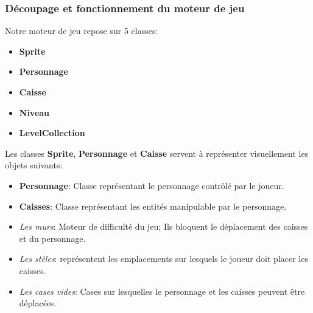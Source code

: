 \documentclass{article}
\begin{document}
		\subsubsection{Découpage et fonctionnement du moteur de jeu}
Notre moteur de jeu repose sur 5 classes:
\begin{itemize}
\item \textbf{Sprite} 
\item \textbf{Personnage }
\item \textbf{Caisse}
\item \textbf{Niveau}
\item \textbf{LevelCollection}
\end{itemize}
Les classes \textbf{Sprite}, \textbf{Personnage} et \textbf{Caisse} servent à représenter visuellement les objets suivants:
\begin{itemize}
\item \textbf{Personnage}: Classe représentant le personnage contrôlé par le joueur.
\item \textbf{Caisses}: Classe représentant les entités manipulable par le personnage.
\item \textit{Les murs}: Moteur de difficulté du jeu; Ils bloquent le déplacement des caisses et du personnage.
\item \textit{Les stèles}: représentent les emplacements sur lesquels le joueur doit placer les caisses.
\item \textit{Les cases vides}: Cases sur lesquelles le personnage et les caisses peuvent être déplacées.
\end{itemize}
\end{document}
